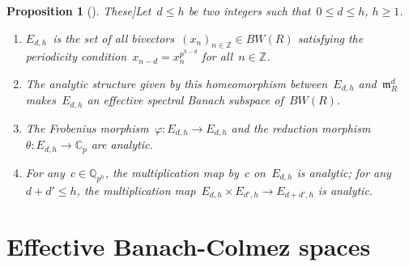 \documentclass{article}
\newtheorem{prop}[thm]{Proposition}
\theoremstyle{definition}
\let\ro\mathcal \let\go\mathfrak
\def\Cp{{ℂ_p}}
\def\pol#1{#1^⋆}
\begin{document}
\goodbreak
\def\x{\cite[4.4.3]{These}}
\begin{prop}[\x]\label{prop:Edh}
Let~$d ≤ h$ be two integers such that~$0 ≤ d ≤ h$, $h ≥ 1$.
\begin{enumerate}
\item 
$E_{d,h}$~is the set of all bivectors~$(x_n)_{n ∈ ℤ} ∈
BW(R)$ satisfying the periodicity condition~$x_{n-d} = x_n^{p^{h-d}}$
for all~$n ∈ ℤ$.
\item The analytic structure given by this homeomorphism
between~$E_{d,h}$ and~$\go m_R^d$
makes~$E_{d,h}$ an effective spectral Banach subspace of~$BW(R)$.
\item The Frobenius morphism~$φ: E_{d,h} → E_{d,h}$ and the reduction
morphism~$θ: E_{d,h} → \Cp$ are analytic.
\item For any~$c ∈ ℚ_{p^h}$, the multiplication map by~$c$ on~$E_{d,h}$
is analytic;
for any~$d + d' ≤ h$,
the multiplication map~$E_{d,h} × E_{d',h} → E_{d+d',h}$ is analytic.
\end{enumerate}
\end{prop}%

% 
% 
% 


\section{Effective Banach-Colmez spaces}
\setcounter{thm}{0}
\end{document}
